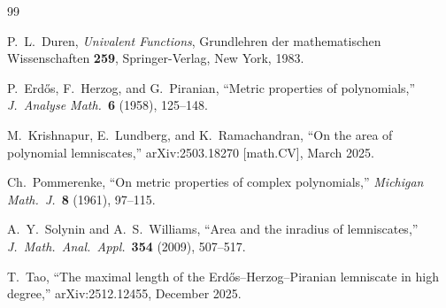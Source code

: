 \documentclass[11pt,a4paper]{amsart}
\theoremstyle{definition}
\begin{document}

\begin{thebibliography}{99}

P.~L.~Duren, \emph{Univalent Functions},
Grundlehren der mathematischen Wissenschaften \textbf{259},
Springer-Verlag, New York, 1983.

P.~Erd\H{o}s, F.~Herzog, and G.~Piranian,
``Metric properties of polynomials,''
\emph{J.\ Analyse Math.}\ \textbf{6} (1958), 125--148.

M.~Krishnapur, E.~Lundberg, and K.~Ramachandran,
``On the area of polynomial lemniscates,''
arXiv:2503.18270 [math.CV], March 2025.

Ch.~Pommerenke,
``On metric properties of complex polynomials,''
\emph{Michigan Math.\ J.}\ \textbf{8} (1961), 97--115.

A.~Y.~Solynin and A.~S.~Williams,
``Area and the inradius of lemniscates,''
\emph{J.\ Math.\ Anal.\ Appl.}\ \textbf{354} (2009), 507--517.

T.~Tao,
``The maximal length of the Erd\H{o}s--Herzog--Piranian lemniscate in high degree,''
arXiv:2512.12455, December 2025.

\end{thebibliography}
\end{document}
